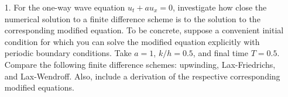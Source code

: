 \documentclass{article}
\begin{document}
\begin{itemize}

\item[1.] For the one-way wave equation $u_t + a u_x = 0$, investigate how close the numerical solution to a finite difference scheme is to the solution to the corresponding modified equation. To be concrete, suppose a convenient initial condition for which you can solve the modified equation explicitly with periodic boundary conditions. Take $a = 1$, $k/h = 0.5$, and final time $T = 0.5$. Compare the following finite difference schemes: upwinding, Lax-Friedrichs, and Lax-Wendroff. Also, include a derivation of the respective corresponding modified equations.

\end{itemize}
\end{document}
